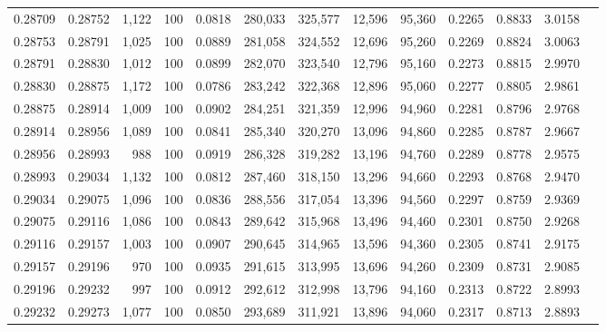 \begin{tabular}{rrrrrrrrrrrrr}
0.28709 & 0.28752 &  1,122 & 100 &                                     0.0818 & 280,033 & 325,577 &  12,596 &  95,360 & 0.2265 & 0.8833 & 3.0158 \\
0.28753 & 0.28791 &  1,025 & 100 &                                     0.0889 & 281,058 & 324,552 &  12,696 &  95,260 & 0.2269 & 0.8824 & 3.0063 \\
0.28791 & 0.28830 &  1,012 & 100 &                                     0.0899 & 282,070 & 323,540 &  12,796 &  95,160 & 0.2273 & 0.8815 & 2.9970 \\
0.28830 & 0.28875 &  1,172 & 100 &                                     0.0786 & 283,242 & 322,368 &  12,896 &  95,060 & 0.2277 & 0.8805 & 2.9861 \\
0.28875 & 0.28914 &  1,009 & 100 &                                     0.0902 & 284,251 & 321,359 &  12,996 &  94,960 & 0.2281 & 0.8796 & 2.9768 \\
0.28914 & 0.28956 &  1,089 & 100 &                                     0.0841 & 285,340 & 320,270 &  13,096 &  94,860 & 0.2285 & 0.8787 & 2.9667 \\
0.28956 & 0.28993 &    988 & 100 &                                     0.0919 & 286,328 & 319,282 &  13,196 &  94,760 & 0.2289 & 0.8778 & 2.9575 \\
0.28993 & 0.29034 &  1,132 & 100 &                                     0.0812 & 287,460 & 318,150 &  13,296 &  94,660 & 0.2293 & 0.8768 & 2.9470 \\
0.29034 & 0.29075 &  1,096 & 100 &                                     0.0836 & 288,556 & 317,054 &  13,396 &  94,560 & 0.2297 & 0.8759 & 2.9369 \\
0.29075 & 0.29116 &  1,086 & 100 &                                     0.0843 & 289,642 & 315,968 &  13,496 &  94,460 & 0.2301 & 0.8750 & 2.9268 \\
0.29116 & 0.29157 &  1,003 & 100 &                                     0.0907 & 290,645 & 314,965 &  13,596 &  94,360 & 0.2305 & 0.8741 & 2.9175 \\
0.29157 & 0.29196 &    970 & 100 &                                     0.0935 & 291,615 & 313,995 &  13,696 &  94,260 & 0.2309 & 0.8731 & 2.9085 \\
0.29196 & 0.29232 &    997 & 100 &                                     0.0912 & 292,612 & 312,998 &  13,796 &  94,160 & 0.2313 & 0.8722 & 2.8993 \\
0.29232 & 0.29273 &  1,077 & 100 &                                     0.0850 & 293,689 & 311,921 &  13,896 &  94,060 & 0.2317 & 0.8713 & 2.8893 \\

\end{tabular}
